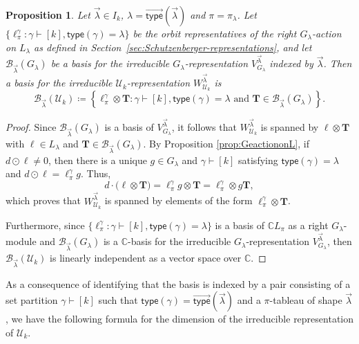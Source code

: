 \documentclass[10pt]{amsart}
\newtheorem{prop}[theorem]{Proposition}
\theoremstyle{definition}
\theoremstyle{remark}
\newcommand{\CC}{\mathbb C}
\newcommand{\vtype}{\overrightarrow{\mathsf{type}}}
\begin{document}
\begin{prop} \label{prop:irrepbasis}
Let $\vec{\lambda} \in I_k$, $\lambda = \vtype(\vec{\lambda})$ and $\pi = \pi_\lambda$.
Let
$\{\ell_\pi^\gamma : \gamma \vdash [k], \mathsf{type}(\gamma) = \lambda\}$
be the orbit representatives of the right $G_\lambda$-action on $L_\lambda$ as defined in
Section~\ref{sec:Schutzenberger-representations},
and let $\mathcal{B}_{\vec{\lambda}}(G_\lambda)$ be a basis for the irreducible
$G_\lambda$-representation $V_{G_\lambda}^{\vec{\lambda}}$ indexed by $\vec{\lambda}$.
Then a basis for the irreducible $\mathcal{U}_k$-representation $W_{\mathcal{U}_k}^{\vec{\lambda}}$ is
\[
    \mathcal{B}_{\vec{\lambda}}(\mathcal{U}_k) \coloneqq \left\{ \ell_\pi^\gamma \otimes \mathbf{T} : \gamma \vdash [k], \mathsf{type}(\gamma) = \lambda \text{ and }
    \mathbf{T} \in \mathcal{B}_{\vec{\lambda}}(G_\lambda) \right\}.
\]
\end{prop}

\begin{proof}
    Since $\mathcal{B}_{\vec{\lambda}}(G_\lambda)$ is a basis of $V_{G_\lambda}^{\vec{\lambda}}$,
    it follows that $W_{\mathcal{U}_k}^{\vec{\lambda}}$ is spanned by $\ell \otimes \mathbf{T}$
    with $\ell \in L_\lambda$ and $\mathbf{T} \in \mathcal{B}_{\vec{\lambda}}(G_{\lambda})$.
    By Proposition \ref{prop:GeactiononL}, if $d\odot \ell\neq 0$, then there is a
    unique $g \in G_{\lambda}$ and $\gamma \vdash [k]$ satisfying $\mathsf{type}(\gamma) = \lambda$ and
    $d\odot \ell = \ell_\pi^\gamma g$. Thus,
    \begin{equation*}
        d \cdot \big(\ell \otimes \mathbf{T}\big)
        = \ell_\pi^{\gamma} g \otimes \mathbf{T}
        = \ell_\pi^{\gamma} \otimes g \mathbf{T},
    \end{equation*}
    which proves that $W_{\mathcal{U}_k}^{\vec{\lambda}}$ is spanned by elements of the form $\ell_\pi^\gamma \otimes \mathbf{T}$.

Furthermore, since $\{\ell_\pi^\gamma : \gamma \vdash [k], \mathsf{type}(\gamma) = \lambda\}$
is a basis of $\mathbb{C}L_\pi$ as a right $G_\lambda$-module
and $\mathcal{B}_{\vec{\lambda}}(G_\lambda)$ is a $\CC$-basis
for the irreducible $G_\lambda$-representation $V^{\vec{\lambda}}_{G_\lambda}$, then
$\mathcal{B}_{\vec{\lambda}}(\mathcal{U}_k)$ is linearly independent
as a vector space over $\mathbb{C}$.
\end{proof}

As a consequence of identifying that the basis is indexed by a pair
consisting of a set partition $\gamma \vdash [k]$ such that
$\mathsf{type}(\gamma) = \vtype(\vec{\lambda})$ and a $\pi$-tableau of
shape $\vec{\lambda}$, we have the following formula for the dimension of
the irreducible representation of $\mathcal{U}_k$.
\end{document}
